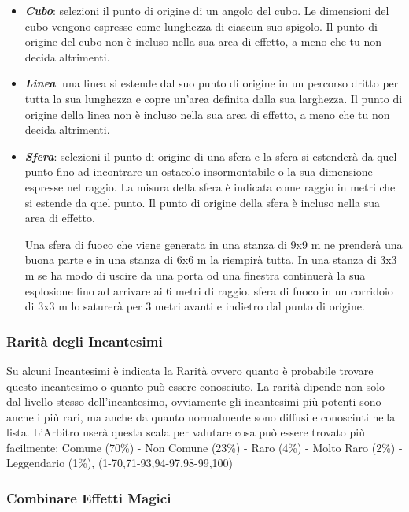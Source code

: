 \documentclass[12pt,a4paper,twoside,openany]{book}
\begin{document}
\begin{multicols}{2}
\begin{itemize}
\item
\textit{\textbf{Cubo}}: selezioni il punto di origine di un angolo del cubo. Le dimensioni del cubo vengono espresse come lunghezza di ciascun suo spigolo. Il punto di origine del cubo non è incluso nella sua area di effetto, a meno che tu non decida altrimenti.
	
\item
\textit{\textbf{Linea}}: una linea si estende dal suo punto di origine in un percorso dritto per tutta la sua lunghezza e copre un'area definita dalla sua larghezza. Il punto di origine della linea non è incluso nella sua area di effetto, a meno che tu non decida altrimenti.
	
\item
\textit{\textbf{Sfera}}: selezioni il punto di origine di una sfera e la sfera si estenderà da quel punto fino ad incontrare un ostacolo insormontabile o la sua dimensione espresse nel raggio. La misura della sfera è indicata come raggio in metri che si estende da quel punto. Il punto di origine della sfera è incluso nella sua area di effetto.
	
Una sfera di fuoco che viene generata in una stanza di 9x9 m ne prenderà una buona parte e in una stanza di 6x6 m la riempirà tutta. In una stanza di 3x3 m se ha modo di uscire da una porta od una finestra continuerà la sua esplosione fino ad arrivare ai 6 metri di raggio. sfera di fuoco in un corridoio di 3x3 m lo saturerà per 3 metri avanti e indietro dal punto di origine.
	
\end{itemize}

\subsubsection{Rarità degli Incantesimi}\label{magieraritaincantesimi}

Su alcuni Incantesimi è indicata la Rarità ovvero quanto è probabile trovare questo incantesimo o quanto può essere conosciuto. La rarità dipende non solo dal livello stesso dell'incantesimo, ovviamente gli incantesimi più potenti sono anche i più rari, ma anche da quanto normalmente sono diffusi e conosciuti nella lista. L'Arbitro userà questa scala per valutare cosa può essere trovato più facilmente: Comune (70\%) - Non Comune (23\%) - Raro (4\%) - Molto Raro (2\%) - Leggendario (1\%), (1-70,71-93,94-97,98-99,100)

\subsubsection{Combinare Effetti Magici}\label{magiecombinareeffettimagici}


\end{multicols}
\end{document}
